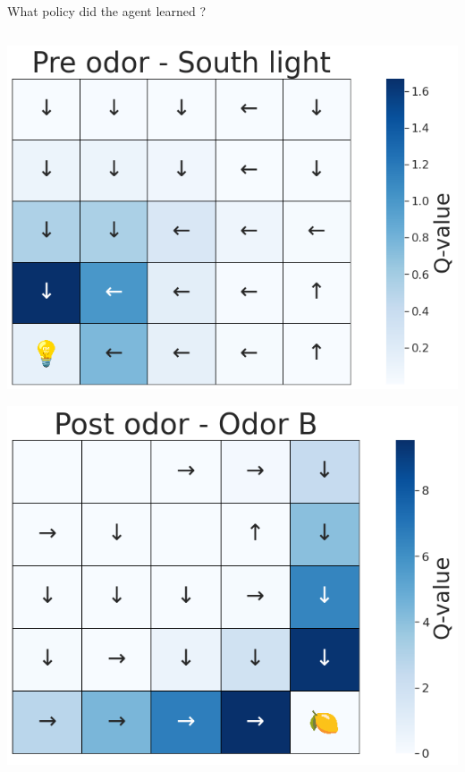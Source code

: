 \documentclass[bigger]{beamer}
\begin{document}
\begin{frame}[label={sec:org1fe4b7e}]{What policy did the agent learned ?}
\begin{columns}
\begin{column}[t]{0.5\columnwidth}
\begin{center}
\includegraphics[height=0.4\textheight]{img/policy-allo-south-light.png}
\end{center}
\begin{center}
\includegraphics[height=0.4\textheight]{img/policy-allo-odor-B.png}
\end{center}
\end{column}
\end{columns}
\end{frame}
\end{document}
